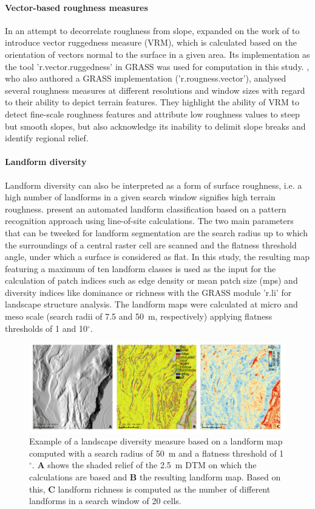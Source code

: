 \documentclass[preprint,12pt,authoryear]{elsarticle}
\begin{document}
\paragraph{Vector-based roughness measures}
 In an attempt to decorrelate roughness from slope, \cite{Sappington2007} expanded on the work of \cite{Hobson1972} to introduce vector ruggedness measure (VRM), which is calculated based on the orientation of vectors normal to the surface in a given area. Its implementation as the tool 'r.vector.ruggedness' in GRASS was used for computation in this study.  \cite{Grohmann2010}, who also authored a GRASS implementation ('r.rougness.vector'), analysed several roughness measures at different resolutions and window sizes with regard to their ability to depict terrain features. They highlight the ability of VRM to detect fine-scale roughness features and attribute low roughness values to steep but smooth slopes, but also acknowledge its inability to delimit slope breaks and identify regional relief.

\paragraph{Landform diversity} 
Landform diversity can also be interpreted as a form of surface roughness, i.e. a high number of landforms in a given search window signifies high terrain roughness. \citep{Jasiewicz2013} present an automated landform classification based on a pattern recognition approach using  line-of-site calculations. The two main parameters that can be tweeked for landform segmentation are the search radius up to which the surroundings of a central raster cell are scanned and the flatness threshold angle, under which a surface is considered as flat. In this study, the resulting map featuring a maximum of ten landform classes is used as the input for the calculation of patch indices such as edge density or mean patch size (mps) and diversity indices like dominance or richness with the GRASS module 'r.li' for landscape structure analysis. The landform maps were calculated at micro and meso scale (search radii of 7.5 and 50~m, respectively) applying flatness thresholds of 1 and 10$^{\circ}$.
 \begin{figure}[ht!]
\includegraphics[width=\textwidth,angle=0]{diversity_100pi.pdf}
\caption{Example of a landscape diversity measure based on a landform map computed with a search radius of 50~m and a flatness threshold of 1$^{\circ}$. \textbf{A} shows the shaded relief of the 2.5~m DTM on which the calculations are based and \textbf{B} the resulting landform map. Based on this, \textbf{C} landform richness  is computed as the number of different landforms in a search window of 20 cells.}
\label{fig:richness}
\end{figure}
\end{document}
